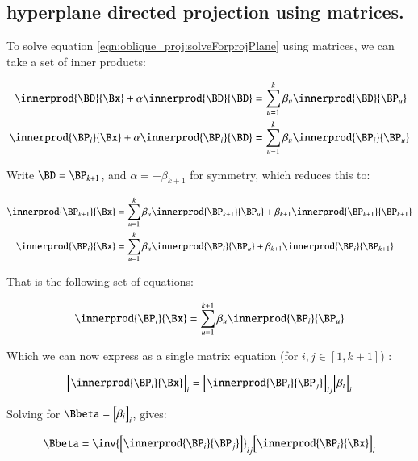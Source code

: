 \subsection{hyperplane directed projection using matrices. }

To solve equation \ref{eqn:oblique_proj:solveForprojPlane} using matrices, we can take a set of inner products:

\begin{align*}
\innerprod{\BD}{\Bx} + \alpha \innerprod{\BD}{\BD} &= \sum_{u=1}^k \beta_u \innerprod{\BD}{\BP_u} \\
\innerprod{\BP_i}{\Bx} + \alpha \innerprod{\BP_i}{\BD} &= \sum_{u=1}^k \beta_u \innerprod{\BP_i}{\BP_u}
\end{align*}

Write $\BD = \BP_{k+1}$, and $\alpha = -\beta_{k+1}$ for symmetry, which reduces this to:

\begin{align*}
\innerprod{\BP_{k+1}}{\Bx} &= \sum_{u=1}^k \beta_u \innerprod{\BP_{k+1}}{\BP_u} + \beta_{k+1} \innerprod{\BP_{k+1}}{\BP_{k+1}}  \\
\innerprod{\BP_i}{\Bx} &= \sum_{u=1}^k \beta_u \innerprod{\BP_i}{\BP_u} + \beta_{k+1} \innerprod{\BP_i}{\BP_{k+1}}
\end{align*}

That is the following set of equations:

\[
\innerprod{\BP_i}{\Bx} = \sum_{u=1}^{k+1} \beta_u \innerprod{\BP_i}{\BP_u}
\]

Which we can now express as a single matrix equation (for $i,j \in [1,k+1]$) :

\begin{equation}
{
\begin{bmatrix}
\innerprod{\BP_i}{\Bx}
\end{bmatrix}
}_i
=
{
\begin{bmatrix}
\innerprod{\BP_i}{\BP_j}
\end{bmatrix}
}_{ij}
{
\begin{bmatrix}
\beta_i
\end{bmatrix}
}_i
\end{equation}

Solving for $\Bbeta = 
{
\begin{bmatrix}
\beta_i
\end{bmatrix}
}_i
$, gives:

\[
\Bbeta = 
\inv{
\begin{bmatrix}
\innerprod{\BP_i}{\BP_j}
\end{bmatrix}
}_{ij}
{
\begin{bmatrix}
\innerprod{\BP_i}{\Bx}
\end{bmatrix}
}_i
\]

